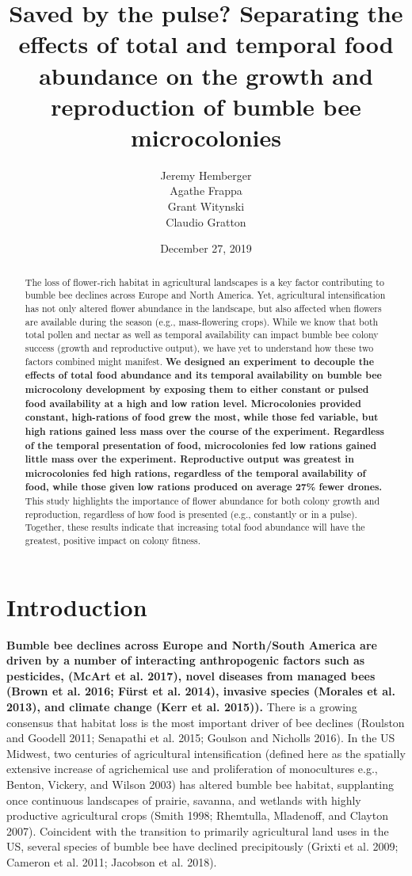 \documentclass[11pt,]{article}
\title{\textbf{Saved by the pulse? Separating the effects of total and temporal
food abundance on the growth and reproduction of bumble bee
microcolonies}}
\author{Jeremy Hemberger \\ Agathe Frappa \\ Grant Witynski \\ Claudio Gratton}
\date{December 27, 2019}
\begin{document}
\maketitle
\begin{abstract}
The loss of flower-rich habitat in agricultural landscapes is a key
factor contributing to bumble bee declines across Europe and North
America. Yet, agricultural intensification has not only altered flower
abundance in the landscape, but also affected when flowers are available
during the season (e.g., mass-flowering crops). While we know that both
total pollen and nectar as well as temporal availability can impact
bumble bee colony success (growth and reproductive output), we have yet
to understand how these two factors combined might manifest. \textbf{We
designed an experiment to decouple the effects of total food abundance
and its temporal availability on bumble bee microcolony development by
exposing them to either constant or pulsed food availability at a high
and low ration level. Microcolonies provided constant, high-rations of
food grew the most, while those fed variable, but high rations gained
less mass over the course of the experiment. Regardless of the temporal
presentation of food, microcolonies fed low rations gained little mass
over the experiment. Reproductive output was greatest in microcolonies
fed high rations, regardless of the temporal availability of food, while
those given low rations produced on average 27\% fewer drones.} This
study highlights the importance of flower abundance for both colony
growth and reproduction, regardless of how food is presented (e.g.,
constantly or in a pulse). Together, these results indicate that
increasing total food abundance will have the greatest, positive impact
on colony fitness.
\end{abstract}

\captionsetup[table]{labelformat=empty}

\hypertarget{introduction}{%
\section{Introduction}\label{introduction}}

\textbf{Bumble bee declines across Europe and North/South America are
driven by a number of interacting anthropogenic factors such as
pesticides, (McArt et al. 2017), novel diseases from managed bees (Brown
et al. 2016; Fürst et al. 2014), invasive species (Morales et al. 2013),
and climate change (Kerr et al. 2015)).} There is a growing consensus
that habitat loss is the most important driver of bee declines (Roulston
and Goodell 2011; Senapathi et al. 2015; Goulson and Nicholls 2016). In
the US Midwest, two centuries of agricultural intensification (defined
here as the spatially extensive increase of agrichemical use and
proliferation of monocultures e.g., Benton, Vickery, and Wilson 2003)
has altered bumble bee habitat, supplanting once continuous landscapes
of prairie, savanna, and wetlands with highly productive agricultural
crops (Smith 1998; Rhemtulla, Mladenoff, and Clayton 2007). Coincident
with the transition to primarily agricultural land uses in the US,
several species of bumble bee have declined precipitously (Grixti et al.
2009; Cameron et al. 2011; Jacobson et al. 2018).
\end{document}
